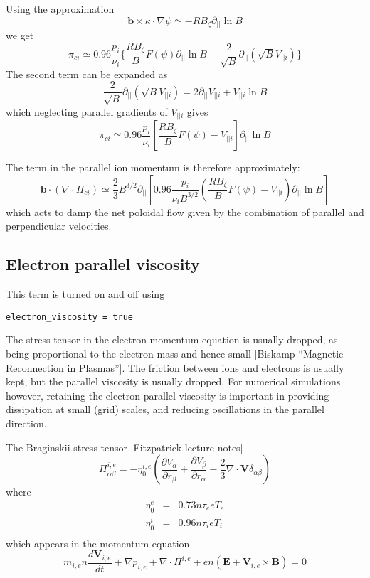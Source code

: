 \documentclass[12pt,a4paper]{article}
\begin{document}
Using the approximation
\begin{equation}
  \mathbf{b}\times\kappa\cdot\nabla\psi \simeq -RB_\zeta \partial_{||}\ln B
\end{equation}
we get
\begin{equation}
  \pi_{ci} \simeq 0.96\frac{p_i}{\nu_i}\Bigg\{\frac{RB_\zeta}{B}F\left(\psi\right)\partial_{||}\ln B - \frac{2}{\sqrt{B}}\partial_{||}\left(\sqrt{B}V_{||i}\right) \Bigg\}
\end{equation}
The second term can be expanded as
\begin{equation}
  \frac{2}{\sqrt{B}}\partial_{||}\left(\sqrt{B}V_{||i}\right) = 2\partial_{||}V_{||i} + V_{||i}\ln B
\end{equation}
which neglecting parallel gradients of $V_{||i}$ gives
\begin{equation}
  \pi_{ci} \simeq 0.96\frac{p_i}{\nu_i}\left[\frac{RB_\zeta}{B}F\left(\psi\right) - V_{||i} \right]\partial_{||}\ln B 
\end{equation}

The term in the parallel ion momentum is therefore approximately:
\begin{equation}
\mathbf{b}\cdot\left(\nabla\cdot\Pi_{ci}\right) \simeq \frac{2}{3}B^{3/2}\partial_{||}\left[0.96\frac{p_i}{\nu_iB^{3/2}}\left(\frac{RB_\zeta}{B}F\left(\psi\right) - V_{||i} \right)\partial_{||}\ln B \right]
\end{equation}
which acts to damp the net poloidal flow given by the combination of parallel and perpendicular velocities.

\subsection{Electron parallel viscosity}

This term is turned on and off using
\begin{verbatim}
electron_viscosity = true
\end{verbatim}

The stress tensor in the electron momentum equation is
usually dropped, as being proportional to the electron mass and hence
small [Biskamp ``Magnetic Reconnection in Plasmas'']. The friction
between ions and electrons is usually kept, but the parallel viscosity
is usually dropped. For numerical simulations however, retaining the
electron parallel viscosity is important in providing dissipation at small
(grid) scales, and reducing oscillations in the parallel direction.

The Braginskii stress tensor [Fitzpatrick lecture notes]
\[
\Pi_{\alpha\beta}^{i,e} = -\eta^{i,e}_0\left(\frac{\partial V_\alpha}{\partial r_\beta} + \frac{\partial V_\beta}{\partial r_\alpha} - \frac{2}{3}\nabla\cdot\mathbf{V}\delta_{\alpha\beta}\right)
\]
where
\begin{eqnarray*}
  \eta_0^e &=& 0.73 n \tau_e eT_e \\
  \eta_0^i &=& 0.96 n \tau_i eT_i \\
\end{eqnarray*}
which appears in the momentum equation
\[
m_{i,e}n\frac{d\mathbf{V}_{i,e}}{dt} + \nabla p_{i,e} + \nabla\cdot\Pi^{i,e} {\mp}en\left(\mathbf{E} + \mathbf{V}_{i,e}\times\mathbf{B}\right) = 0
\]
\end{document}
